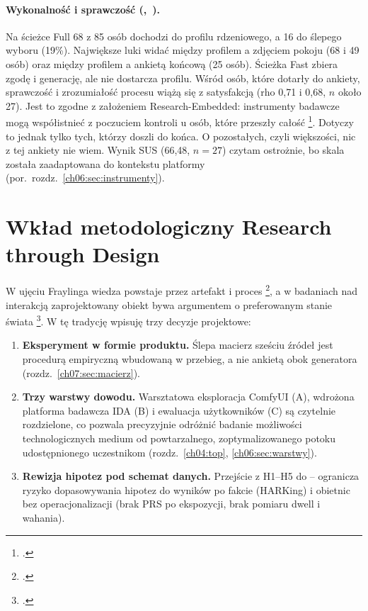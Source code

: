 \paragraph{Wykonalność i sprawczość (,~).}
Na ścieżce Full 68 z 85 osób dochodzi do profilu rdzeniowego, a 16 do ślepego wyboru (19\%). Największe luki widać między profilem a zdjęciem pokoju (68 i 49 osób) oraz między profilem a ankietą końcową (25 osób). Ścieżka Fast zbiera zgodę i generację, ale nie dostarcza profilu.
Wśród osób, które dotarły do ankiety, sprawczość i zrozumiałość procesu wiążą się z satysfakcją (rho 0,71 i 0,68, $n$ około 27). Jest to zgodne z założeniem Research-Embedded: instrumenty badawcze mogą współistnieć z poczuciem kontroli u osób, które przeszły całość \footcite{zimmerman2007rtd}. Dotyczy to jednak tylko tych, którzy doszli do końca. O pozostałych, czyli większości, nic z tej ankiety nie wiem.
Wynik SUS (66,48, $n=27$) czytam ostrożnie, bo skala została zaadaptowana do kontekstu platformy (por.\ rozdz.~\ref{ch06:sec:instrumenty}).

\section{Wkład metodologiczny Research through Design}
\label{ch09:sec:rtd}

W ujęciu Fraylinga wiedza powstaje przez artefakt i proces \footcite{frayling1993research}, a w badaniach nad interakcją zaprojektowany obiekt bywa argumentem o preferowanym stanie świata \footcite{zimmerman2007rtd}.
W tę tradycję wpisuję trzy decyzje projektowe:

\begin{enumerate}
  \item \textbf{Eksperyment w formie produktu.} Ślepa macierz sześciu źródeł jest procedurą empiryczną wbudowaną w przebieg, a nie ankietą obok generatora (rozdz.~\ref{ch07:sec:macierz}).
  \item \textbf{Trzy warstwy dowodu.} Warsztatowa eksploracja ComfyUI (A), wdrożona platforma badawcza IDA (B) i ewaluacja użytkowników (C) są czytelnie rozdzielone, co pozwala precyzyjnie odróżnić badanie możliwości technologicznych medium od powtarzalnego, zoptymalizowanego potoku udostępnionego uczestnikom (rozdz.~\ref{ch04:top}, \ref{ch06:sec:warstwy}).
  \item \textbf{Rewizja hipotez pod schemat danych.} Przejście z H1--H5 do -- ogranicza ryzyko dopasowywania hipotez do wyników po fakcie (HARKing) i obietnic bez operacjonalizacji (brak PRS po ekspozycji, brak pomiaru dwell i wahania).
\end{enumerate}

